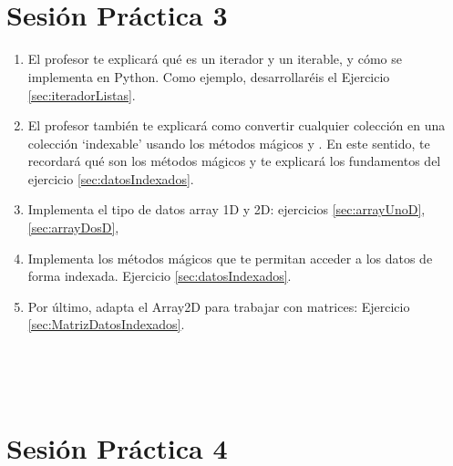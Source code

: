 \


\


\section*{Sesión Práctica 3}

\begin{enumerate}%

\item El profesor te explicará qué es un iterador y un iterable, y cómo se implementa en Python.  Como ejemplo, desarrollaréis el Ejercicio \ref{sec:iteradorListas}.

\item El profesor también te explicará como convertir cualquier colección en una colección `indexable' usando los métodos mágicos  y . En este sentido, te recordará qué son los métodos mágicos y te explicará  los fundamentos del ejercicio \ref{sec:datosIndexados}.


\item Implementa el tipo de datos array 1D y 2D: ejercicios \ref{sec:arrayUnoD}, \ref{sec:arrayDosD}, 


\item Implementa los métodos mágicos que te permitan acceder a los datos de forma indexada. Ejercicio \ref{sec:datosIndexados}.

\item Por último, adapta el Array2D para trabajar con matrices: Ejercicio \ref{sec:MatrizDatosIndexados}. 

\end{enumerate}




\


\


\section*{Sesión Práctica 4}


